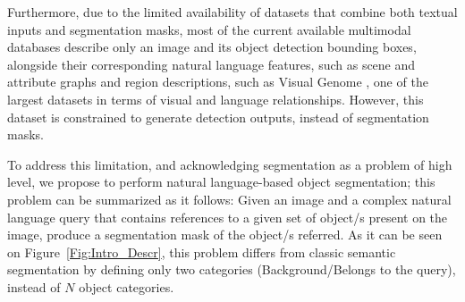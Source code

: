 Furthermore, due to the limited availability of datasets that combine both textual inputs and segmentation masks, most of the current available multimodal databases describe only an image and its object detection bounding boxes, alongside their corresponding natural language features, such as scene and attribute graphs and region descriptions, such as Visual Genome \cite{krishna_visual_2016}, one of the largest datasets in terms of visual and language relationships. However, this dataset is constrained to generate detection outputs, instead of segmentation masks.

To address this limitation, and acknowledging segmentation as a problem of high level, we propose to perform natural language-based object segmentation; this problem can be summarized as it follows: Given an image and a complex natural language query that contains references to a given set of object/s present on the image, produce a segmentation mask of the object/s referred. As it can be seen on Figure~\ref{Fig:Intro_Descr}, this problem differs from classic semantic segmentation by defining only two categories (Background/Belongs to the query), instead of $N$ object categories.

